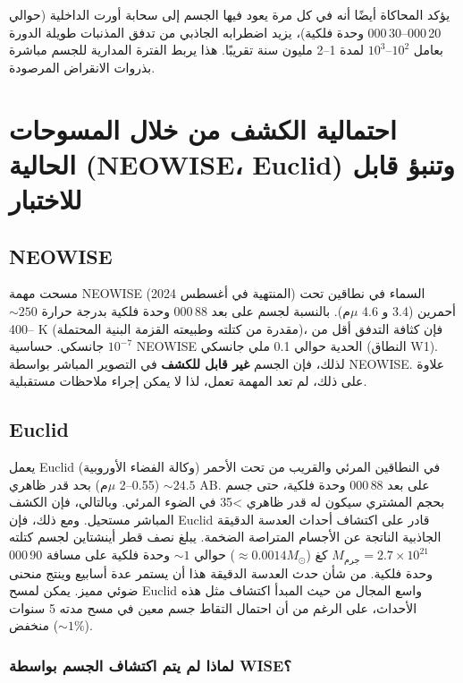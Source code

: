\documentclass[11pt,a4paper]{article}
\begin{document}
	يؤكد المحاكاة أيضًا أنه في كل مرة يعود فيها الجسم إلى سحابة أورت الداخلية (حوالي 20\,000–30\,000 وحدة فلكية)، يزيد اضطرابه الجاذبي من تدفق المذنبات طويلة الدورة بعامل \(10^2\)–\(10^3\) لمدة 1–2 مليون سنة تقريبًا. هذا يربط الفترة المدارية للجسم مباشرة بذروات الانقراض المرصودة.
	
	\section{احتمالية الكشف من خلال المسوحات الحالية (NEOWISE، Euclid) وتنبؤ قابل للاختبار}
	
	\subsection{NEOWISE}
	
	مسحت مهمة NEOWISE (المنتهية في أغسطس 2024) السماء في نطاقين تحت أحمرين (3.4 و 4.6 \(\mu\)م). بالنسبة لجسم على بعد 88\,000 وحدة فلكية بدرجة حرارة \(\sim 250\)–400 K (مقدرة من كتلته وطبيعته القزمة البنية المحتملة)، فإن كثافة التدفق أقل من \(10^{-7}\) جانسكي. حساسية NEOWISE الحدية حوالي 0.1 ملي جانسكي (النطاق W1). لذلك، فإن الجسم \textbf{غير قابل للكشف} في التصوير المباشر بواسطة NEOWISE. علاوة على ذلك، لم تعد المهمة تعمل، لذا لا يمكن إجراء ملاحظات مستقبلية.
	
	\subsection{Euclid}
	
	يعمل Euclid (وكالة الفضاء الأوروبية) في النطاقين المرئي والقريب من تحت الأحمر (0.55–2 \(\mu\)م) بحد قدر ظاهري \(\sim 24.5\) AB. على بعد 88\,000 وحدة فلكية، حتى جسم بحجم المشتري سيكون له قدر ظاهري >35 في الضوء المرئي. وبالتالي، فإن الكشف المباشر مستحيل. ومع ذلك، فإن Euclid قادر على اكتشاف أحداث العدسة الدقيقة الجاذبية الناتجة عن الأجسام المتراصة الضخمة. يبلغ نصف قطر أينشتاين لجسم كتلته \(M_{\text{جرم}} = 2.7\times10^{21}\) كغ (\(\approx 0.0014 M_{\odot}\)) حوالي \(\sim 1\) وحدة فلكية على مسافة 90\,000 وحدة فلكية. من شأن حدث العدسة الدقيقة هذا أن يستمر عدة أسابيع وينتج منحنى ضوئي مميز. يمكن لمسح Euclid واسع المجال من حيث المبدأ اكتشاف مثل هذه الأحداث، على الرغم من أن احتمال التقاط جسم معين في مسح مدته 5 سنوات منخفض (\(\sim 1\%\)).
	
	\subsubsection{لماذا لم يتم اكتشاف الجسم بواسطة WISE؟}
	
\end{document}
